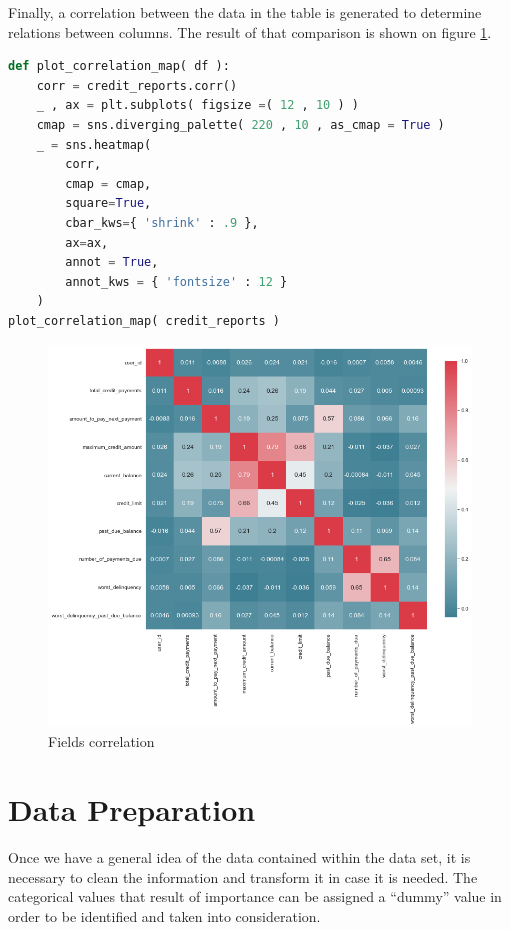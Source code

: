 \documentclass[a4paper,12pt]{article}
\begin{document}
Finally, a correlation between the data in the table is generated to determine relations between columns. The result of that comparison is shown on figure \ref{fig:userscorr}.\vspace{3mm}

\begin{lstlisting}[language=python,caption = {Correlation of data}]
def plot_correlation_map( df ):
    corr = credit_reports.corr()
    _ , ax = plt.subplots( figsize =( 12 , 10 ) )
    cmap = sns.diverging_palette( 220 , 10 , as_cmap = True )
    _ = sns.heatmap(
        corr, 
        cmap = cmap,
        square=True, 
        cbar_kws={ 'shrink' : .9 }, 
        ax=ax, 
        annot = True, 
        annot_kws = { 'fontsize' : 12 }
    )
plot_correlation_map( credit_reports )
\end{lstlisting}

\begin{figure}[h!]
    \centering
    \includegraphics[scale=0.425]{Images/users_class_corr.png}
    \caption{Fields correlation}
    \label{fig:userscorr}
\end{figure}\newpage

\section{Data Preparation} 
Once we have a general idea of the data contained within the data set, it is necessary to clean the information and transform it in case it is needed.
The categorical values that result of importance can be assigned a ``dummy'' value in order to be identified and taken into consideration.
\end{document}
